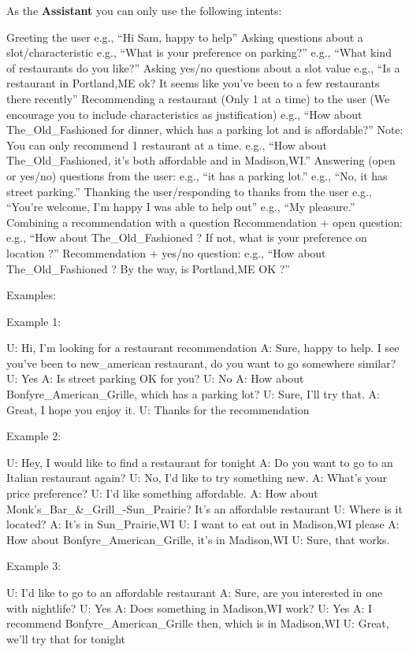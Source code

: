 \documentclass[11pt,a4paper]{article}
\begin{document}
As the \textbf{Assistant} you can only use the following intents:

Greeting the user
    e.g., ``Hi Sam, happy to help''
Asking questions about a slot/characteristic
    e.g., ``What is your preference on parking?''
    e.g., ``What kind of restaurants do you like?''
Asking yes/no questions about a slot value
    e.g., ``Is a restaurant in Portland,ME ok? It seems like you’ve been to a few restaurants there recently''
Recommending a restaurant (Only 1 at a time) to the user (We encourage you to include characteristics as justification)
e.g., ``How about The_Old_Fashioned for dinner, which has a parking lot and is affordable?''
Note: You can only recommend 1 restaurant at a time.
e.g., ``How about The_Old_Fashioned, it’s both affordable and in Madison,WI.''
Answering (open or yes/no) questions from the user:
e.g., ``it has a parking lot.''
e.g., ``No, it has street parking.''
Thanking the user/responding to thanks from the user
    e.g., ``You’re welcome, I’m happy I was able to help out''
    e.g., ``My pleasure.''
Combining a recommendation with a question
    Recommendation + open question:
        e.g., ``How about The_Old_Fashioned ? If not, what is your preference on location ?''
    Recommendation + yes/no question:
        e.g., ``How about The_Old_Fashioned ? By the way, is Portland,ME OK ?''
\fi

\iffalse
Examples:

Example 1:

U: Hi, I’m looking for a restaurant recommendation
A: Sure, happy to help. I see you’ve been to new_american restaurant, do you want to go somewhere similar?
U: Yes
A: Is street parking OK for you?
U: No
A: How about Bonfyre_American_Grille, which has a parking lot? 
U: Sure, I’ll try that.
A: Great, I hope you enjoy it.
U: Thanks for the recommendation

Example 2:

U: Hey, I would like to find a restaurant for tonight
A: Do you want to go to an Italian restaurant again?
U: No, I’d like to try something new.
A: What’s your price preference?
U: I’d like something affordable.
A: How about Monk’s_Bar_&_Grill_-Sun_Prairie? It’s an affordable restaurant
U: Where is it located?
A: It’s in Sun_Prairie,WI
U: I want to eat out in Madison,WI please
A: How about Bonfyre_American_Grille, it’s in Madison,WI
U: Sure, that works.

Example 3:

U: I’d like to go to an affordable restaurant
A: Sure, are you interested in one with nightlife? 
U: Yes
A: Does something in Madison,WI work?
U: Yes
A: I recommend Bonfyre_American_Grille then, which is in Madison,WI
U: Great, we’ll try that for tonight
\end{document}
